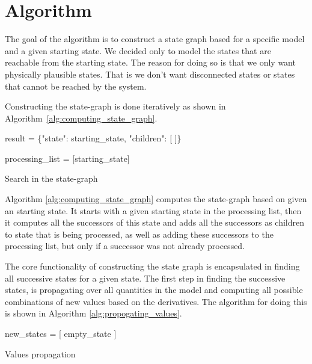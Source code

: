 \documentclass[a4paper]{article}
\begin{document}
\newpage
\section{Algorithm}
The goal of the algorithm is to construct a state graph based for a specific model and a given starting state. We decided only to model the states that are reachable from the starting state. The reason for doing so is that we only want physically plausible states. That is we don't want disconnected states or states that cannot be reached by the system.

Constructing the state-graph is done iteratively as shown in Algorithm~\ref{alg:computing_state_graph}.

\vspace{12pt}
\begin{algorithm}[H]
    result = \{"state": starting\_state, "children": [ ]\}

    processing\_list = [starting\_state]

\caption{Search in the state-graph}
\label{alg:computing_state_graph}
\end{algorithm}
\vspace{12pt}

Algorithm \ref{alg:computing_state_graph} computes the state-graph based on given an starting state. It starts with a given starting state in the processing list, then it computes all the successors of this state and adds all the successors as children to state that is being processed, as well as adding these successors to the processing list, but only if a successor was not already processed.

The core functionality of constructing the state graph is encapsulated in finding all successive states for a given state. The first step in finding the successive states, is propagating over all quantities in the model and computing all possible combinations of new values based on the derivatives. The algorithm for doing this is shown in Algorithm \ref{alg:propogating_values}.

\vspace{12pt}
\begin{algorithm}[H]
new\_states = [ empty\_state ]

\caption{Values propagation}
\label{alg:propogating_values}
\end{algorithm}
\vspace{12pt}
\end{document}
